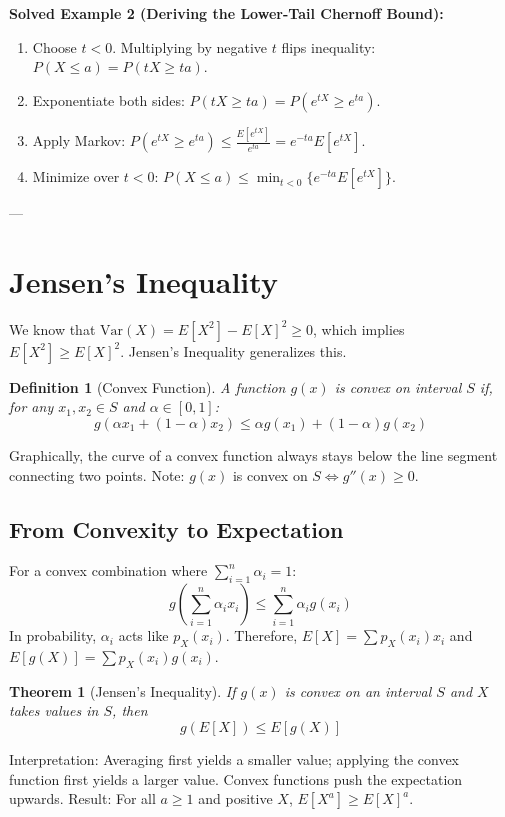 \documentclass[11pt]{article}
\newtheorem{theorem}{Theorem}
\newtheorem{definition}{Definition}
\begin{document}
\textbf{Solved Example 2 (Deriving the Lower-Tail Chernoff Bound):}
\begin{enumerate}
    \item Choose $t < 0$. Multiplying by negative $t$ flips inequality: $P(X \le a) = P(tX \ge ta)$.
    \item Exponentiate both sides: $P(tX \ge ta) = P(e^{tX} \ge e^{ta})$.
    \item Apply Markov: $P(e^{tX} \ge e^{ta}) \le \frac{E[e^{tX}]}{e^{ta}} = e^{-ta}E[e^{tX}]$.
    \item Minimize over $t<0$: $P(X \le a) \le \min_{t<0} \{ e^{-ta} E[e^{tX}] \}$.
\end{enumerate}

---

\section{Jensen's Inequality}

We know that $\text{Var}(X) = E[X^2] - E[X]^2 \ge 0$, which implies $E[X^2] \ge E[X]^2$. Jensen's Inequality generalizes this.

\begin{definition}[Convex Function]
A function $g(x)$ is convex on interval $S$ if, for any $x_1, x_2 \in S$ and $\alpha \in [0,1]$:
\[ g(\alpha x_1 + (1-\alpha)x_2) \le \alpha g(x_1) + (1-\alpha)g(x_2) \]
\end{definition}
Graphically, the curve of a convex function always stays below the line segment connecting two points. Note: $g(x)$ is convex on $S \iff g''(x) \ge 0$.

\subsection{From Convexity to Expectation}
For a convex combination where $\sum_{i=1}^{n} \alpha_i = 1$:
\[ g\left(\sum_{i=1}^{n} \alpha_i x_i\right) \le \sum_{i=1}^{n} \alpha_i g(x_i) \]
In probability, $\alpha_i$ acts like $p_X(x_i)$. Therefore, $E[X] = \sum p_X(x_i) x_i$ and $E[g(X)] = \sum p_X(x_i) g(x_i)$.

\begin{theorem}[Jensen's Inequality]
If $g(x)$ is convex on an interval $S$ and $X$ takes values in $S$, then
\[ g(E[X]) \le E[g(X)] \]
\end{theorem}
Interpretation: Averaging first yields a smaller value; applying the convex function first yields a larger value. Convex functions push the expectation upwards. Result: For all $a \ge 1$ and positive $X$, $E[X^a] \ge E[X]^a$.
\end{document}
